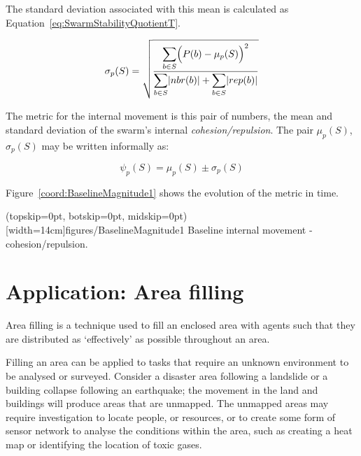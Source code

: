 \documentclass{ieeeaccess}
\begin{document}
The standard deviation associated with this mean is calculated as Equation~\ref{eq:SwarmStabilityQuotientT}.

\begin{equation}
\label{eq:SwarmStabilityQuotientT}
\sigma_p(S) = \sqrt{\frac{\mathlarger{\sum_{b \in S}}\Big(P(b)-\mu_p(S)\Big)^2}{\mathlarger{\sum_{b \in S}}|nbr(b)| + \mathlarger{\sum_{b \in S}}|rep(b)|}}
\end{equation}

The metric for the internal movement is this pair of numbers, the mean and standard deviation of the swarm's internal \textit{cohesion/repulsion}. The pair $\mu_p(S)$, $\sigma_p(S)$ may be written informally as: 

\begin{equation}
\label{eq:SwarmPotentialMagnitude}
\psi_p(S) = \mu_p(S)\pm \sigma_p(S)
\end{equation}

Figure~\ref{coord:BaselineMagnitude1} shows the evolution of the metric in time.

\Figure[t!](topskip=0pt, botskip=0pt, midskip=0pt)[width=14cm]{figures/BaselineMagnitude1}
{Baseline internal movement - cohesion/repulsion.\label{coord:BaselineMagnitude1}}


\section{Application: Area filling}\label{Section:ApplicationFloodFilling}

Area filling is a technique used to fill an enclosed area with agents such that they are distributed as `effectively' as possible throughout an area. 

Filling an area can be applied to tasks that require an unknown environment to be analysed or surveyed. Consider a disaster area following a landslide or a building collapse following an earthquake; the movement in the land and buildings will produce areas that are unmapped. The unmapped areas may require investigation to locate people, or resources, or to create some form of sensor network to analyse the conditions within the area, such as creating a heat map or identifying the location of toxic gases. 
\end{document}
